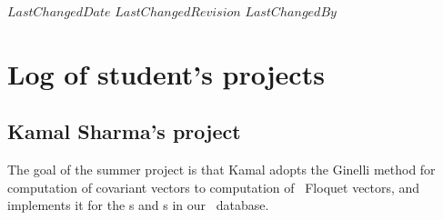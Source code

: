 \ifsvnmulti
 {$LastChangedDate$}
 {$LastChangedRevision$} {$LastChangedBy$}
\fi

\chapter{Log of student's projects}
\label{c-students}

\section{Kamal Sharma's project}
\label{sect:introKamal}

The goal of the summer project is that Kamal adopts the Ginelli \etal{} method for computation of covariant vectors to computation of \po\ Floquet vectors,  and implements it for the \po s and \rpo s in our \KS\ database.


